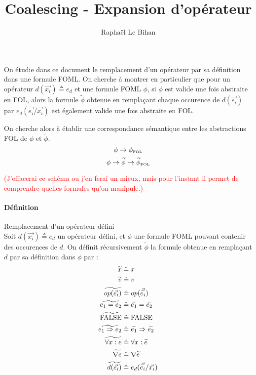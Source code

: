 \documentclass[12pt]{article}
\title{Coalescing - Expansion d'opérateur}
\author{Raphaël Le Bihan}
\newcommand{\defeq}{\ensuremath{\; \hat{=} \;}}
\newcommand{\FOL}{\ensuremath{\textup{\tiny{}FOL}}}
\newcommand{\raph}[1]{\textcolor{red}{#1}}
\begin{document}
\maketitle

On étudie dans ce document le remplacement d'un opérateur par sa définition dans une formule FOML.
On cherche à montrer en particulier que pour un opérateur $d(\vec{x_i}) \triangleq e_d$ et une formule FOML $\phi$, si $\phi$ est valide une fois abstraite en FOL, alors la formule $\widetilde{\phi}$ obtenue en remplaçant chaque occurence de $d(\vec{e_i})$ par $e_d(\vec{e_i}/\vec{x_i})$ est également valide une fois abstraite en FOL.

On cherche alors à établir une correspondance sémantique entre les abstractions FOL de $\phi$ et $\widetilde{\phi}$.
\[
  \phi \to \phi_\FOL
\]
\[
  \phi \to \widetilde{\phi} \to \widetilde{\phi}_\FOL
\]

\raph{%
  (J'effacerai ce schéma ou j'en ferai un mieux, mais pour l'instant il permet de comprendre quelles formules qu'on manipule.)}

\paragraph{Définition} Remplacement d'un opérateur défini\\
Soit $d(\vec{x_i}) \triangleq e_d$ un opérateur défini, et $\phi$ une formule FOML pouvant contenir des occurences de $d$.
On définit récursivement $\widetilde{\phi}$ la formule obtenue en remplaçant $d$ par sa définition dans $\phi$ par :
\begin{align*}
  \widetilde{x} &\defeq x \\
  \widetilde{v} &\defeq v \\
  \widetilde{op(\vec{e_i})} &\defeq op(\vec{\widetilde{e_i}}) \\
  \widetilde{e_1 = e_2} &\defeq \widetilde{e_1} = \widetilde{e_2} \\
  \widetilde{\textup{FALSE}} &\defeq \textup{FALSE} \\
  \widetilde{e_1 \Rightarrow e_2} &\defeq \widetilde{e_1} \Rightarrow \widetilde{e_2} \\
  \widetilde{\forall x : e } &\defeq \forall x : \widetilde{e} \\
  \widetilde{\nabla e} &\defeq \nabla \widetilde{e} \\
  \widetilde{d(\vec{e_i})} &\defeq e_d(\vec{\widetilde{e_i}}/\vec{x_i})
\end{align*}
\end{document}
